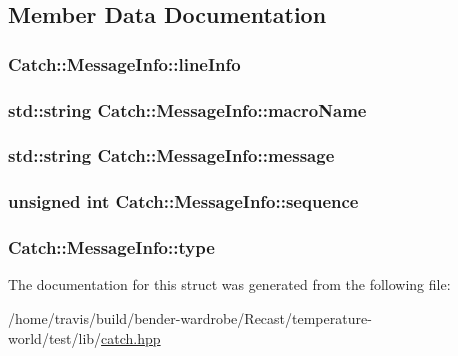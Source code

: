 \subsection{Member Data Documentation}
\hypertarget{struct_catch_1_1_message_info_a985165328723e599696ebd8e43195cc5}{
\subsubsection[{line\-Info}]{ Catch\-::\-Message\-Info\-::line\-Info}}\label{struct_catch_1_1_message_info_a985165328723e599696ebd8e43195cc5}
\hypertarget{struct_catch_1_1_message_info_a156ade4b3cc731f6ec7b542ae47ba8e3}{
\subsubsection[{macro\-Name}]{\setlength{\rightskip}{0pt plus 5cm}std\-::string Catch\-::\-Message\-Info\-::macro\-Name}}\label{struct_catch_1_1_message_info_a156ade4b3cc731f6ec7b542ae47ba8e3}
\hypertarget{struct_catch_1_1_message_info_ab6cd06e050bf426c6577502a5c50e256}{
\subsubsection[{message}]{\setlength{\rightskip}{0pt plus 5cm}std\-::string Catch\-::\-Message\-Info\-::message}}\label{struct_catch_1_1_message_info_ab6cd06e050bf426c6577502a5c50e256}
\hypertarget{struct_catch_1_1_message_info_a7f4f57ea21e50160adefce7b68a781d6}{
\subsubsection[{sequence}]{\setlength{\rightskip}{0pt plus 5cm}unsigned int Catch\-::\-Message\-Info\-::sequence}}\label{struct_catch_1_1_message_info_a7f4f57ea21e50160adefce7b68a781d6}
\hypertarget{struct_catch_1_1_message_info_ae928b9117465c696e45951d9d0284e78}{
\subsubsection[{type}]{ Catch\-::\-Message\-Info\-::type}}\label{struct_catch_1_1_message_info_ae928b9117465c696e45951d9d0284e78}


The documentation for this struct was generated from the following file\-:\begin{DoxyCompactItemize}
\item 
/home/travis/build/bender-\/wardrobe/\-Recast/temperature-\/world/test/lib/\hyperlink{catch_8hpp}{catch.\-hpp}\end{DoxyCompactItemize}
